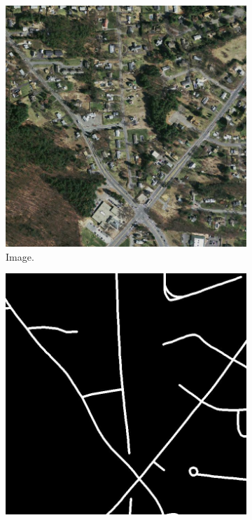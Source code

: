 \begin{figure}[H]
\begin{subfigure}{0.23\textwidth}
\includegraphics[width=\textwidth]{figs/appendix/img11128870_15.jpg}
\caption{ Image. }
\vspace{0.2cm} %
\end{subfigure}
\hspace*{\fill} %
\begin{subfigure}{0.23\textwidth}
\includegraphics[width=\textwidth]{figs/appendix/label11128870_15.jpg}

\end{subfigure}
\end{figure}
